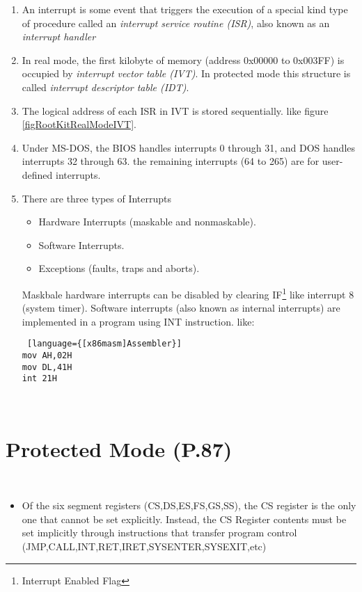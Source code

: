 \begin{note}
\begin{enumerate}
\item An interrupt is some event that triggers the execution of a special kind type of procedure called an \textit{interrupt service routine (ISR)}, also known as an \textit{interrupt handler}
\item In real mode, the first kilobyte of memory (address 0x00000 to 0x003FF) is occupied by \textit{interrupt vector table (IVT)}. In protected mode this structure is called \textit{interrupt descriptor table (IDT)}.
\item The logical address of each ISR in IVT is stored sequentially. like figure \ref{figRootKitRealModeIVT}.

\item Under MS-DOS, the BIOS handles interrupts 0 through 31, and DOS handles interrupts 32 through 63. the remaining interrupts (64 to 265) are for user-defined interrupts.
\item There are three types of Interrupts
\begin{itemize}
\item Hardware Interrupts (maskable and nonmaskable).
\item Software Interrupts.
\item Exceptions (faults, traps and aborts).
\end{itemize}
Maskbale hardware interrupts can be disabled by clearing IF\footnote{Interrupt Enabled Flag} like interrupt 8 (system timer). Software interrupts (also known as internal interrupts) are implemented in a program using INT instruction. like:
\begin{lstlisting} [language={[x86masm]Assembler}]
mov AH,02H
mov DL,41H
int 21H
\end{lstlisting}
\end{enumerate}
\end{note}

\begin{note}\\


\end{note}
\newpage
\section{Protected Mode (P.87)}
\begin{note}\\

\begin{itemize}
\item Of the six segment registers (CS,DS,ES,FS,GS,SS), the CS register is the only one that cannot be set explicitly. Instead, the CS Register contents must be set implicitly through instructions that transfer program control (JMP,CALL,INT,RET,IRET,SYSENTER,SYSEXIT,etc)
\end{itemize}
\end{note}

